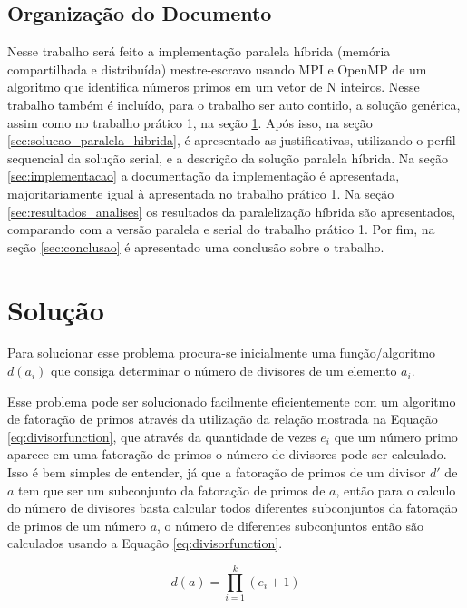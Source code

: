 \documentclass[12pt]{article}
\begin{document}
\subsection{Organização do Documento}

Nesse trabalho será feito a implementação paralela híbrida (memória compartilhada e distribuída) mestre-escravo usando MPI e OpenMP de um algoritmo que identifica números primos em um vetor de N inteiros. Nesse trabalho também é incluído, para o trabalho ser auto contido, a solução genérica, assim como no trabalho prático 1, na seção \ref{sec:solucao}. Após isso, na seção \ref{sec:solucao_paralela_hibrida}, é apresentado as justificativas, utilizando o perfil sequencial da solução serial, e a descrição da solução paralela híbrida. Na seção \ref{sec:implementacao} a documentação da implementação é apresentada, majoritariamente igual à apresentada no trabalho prático 1. Na seção \ref{sec:resultados_analises} os resultados da paralelização híbrida são apresentados, comparando com a versão paralela e serial do trabalho prático 1. Por fim, na seção \ref{sec:conclusao} é apresentado uma conclusão sobre o trabalho.


\section{Solução}
\label{sec:solucao}

Para solucionar esse problema procura-se inicialmente uma função/algoritmo $d(a_i)$ que consiga determinar o número de divisores de um elemento $a_i$.

Esse problema pode ser solucionado facilmente eficientemente com um algoritmo de fatoração de primos através da utilização da relação mostrada na Equação \ref{eq:divisorfunction}, que através da quantidade de vezes $e_i$ que um número primo aparece em uma fatoração de primos o número de divisores pode ser calculado. Isso é bem simples de entender, já que a fatoração de primos de um divisor $d'$ de $a$ tem que ser um subconjunto da fatoração de primos de $a$, então para o calculo do número de divisores basta calcular todos diferentes subconjuntos da fatoração de primos de um número $a$, o número de diferentes subconjuntos então são calculados usando a Equação \ref{eq:divisorfunction}.

\begin{equation}\label{eq:divisorfunction}
	d(a)=\prod_{i=1}^{k} (e_i+1)
\end{equation}
\end{document}
